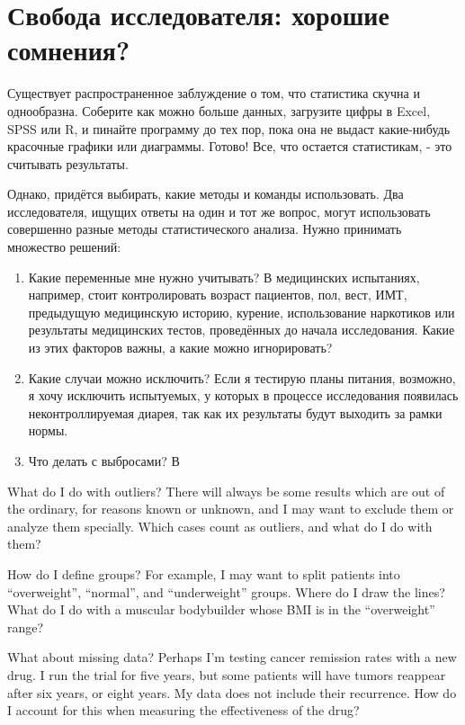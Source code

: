 \chapter{Свобода исследователя: хорошие сомнения? }
\label{chp8}

Существует распространенное заблуждение о том, что статистика скучна и однообразна. Соберите как можно больше данных, загрузите цифры в Excel, SPSS или R, и пинайте программу до тех пор, пока она не выдаст какие-нибудь красочные графики или диаграммы. Готово! Все, что остается статистикам, - это считывать результаты.

Однако, придётся выбирать, какие методы и команды использовать. Два исследователя, ищущих ответы на один и тот же вопрос, могут использовать совершенно разные методы статистического анализа. Нужно принимать множество решений:


\begin{enumerate}
	\item Какие переменные мне нужно учитывать? В медицинских испытаниях, например, стоит контролировать возраст пациентов, пол, вест, ИМТ, предыдущую медицинскую историю, курение, использование наркотиков или результаты медицинских тестов, проведённых до начала исследования. Какие из этих факторов важны, а какие можно игнорировать?

	\item Какие случаи можно исключить? Если я тестирую планы питания, возможно, я хочу исключить испытуемых, у которых в процессе исследования появилась неконтроллируемая диарея, так как их результаты будут выходить за рамки нормы.

	\item Что делать с выбросами? В    



\end{enumerate}

    
    
    What do I do with outliers? There will always be some results which are out of the ordinary, for reasons known or unknown, and I may want to exclude them or analyze them specially. Which cases count as outliers, and what do I do with them?
    
    How do I define groups? For example, I may want to split patients into “overweight”, “normal”, and “underweight” groups. Where do I draw the lines? What do I do with a muscular bodybuilder whose BMI is in the “overweight” range?
    
    What about missing data? Perhaps I’m testing cancer remission rates with a new drug. I run the trial for five years, but some patients will have tumors reappear after six years, or eight years. My data does not include their recurrence. How do I account for this when measuring the effectiveness of the drug?
    
